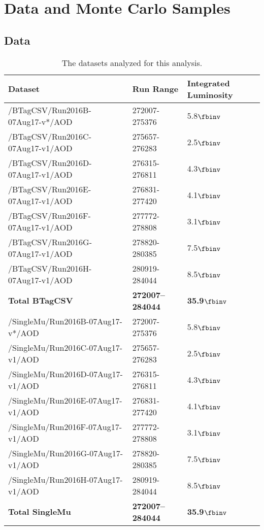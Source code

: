 \section{Data and Monte Carlo Samples}
\subsection{Data}

\begin{table}[hbtp]\footnotesize
\centering
\begin{tabular}{l l l}
\hline
 Dataset & Run Range & Integrated Luminosity \\
\hline
/BTagCSV/Run2016B-07Aug17-v*/AOD & 272007-275376 & 5.8$\fbinv$ \\
/BTagCSV/Run2016C-07Aug17-v1/AOD & 275657-276283 & 2.5$\fbinv$ \\
/BTagCSV/Run2016D-07Aug17-v1/AOD & 276315-276811 & 4.3$\fbinv$ \\
/BTagCSV/Run2016E-07Aug17-v1/AOD & 276831-277420 & 4.1$\fbinv$ \\
/BTagCSV/Run2016F-07Aug17-v1/AOD & 277772-278808 & 3.1$\fbinv$ \\
/BTagCSV/Run2016G-07Aug17-v1/AOD & 278820-280385 & 7.5$\fbinv$ \\
/BTagCSV/Run2016H-07Aug17-v1/AOD & 280919-284044 & 8.5$\fbinv$ \\
{\bf Total BTagCSV} & {\bf 272007--284044} & {\bf 35.9$\fbinv$} \\
\hline
/SingleMu/Run2016B-07Aug17-v*/AOD & 272007-275376 & 5.8$\fbinv$ \\
/SingleMu/Run2016C-07Aug17-v1/AOD & 275657-276283 & 2.5$\fbinv$ \\
/SingleMu/Run2016D-07Aug17-v1/AOD & 276315-276811 & 4.3$\fbinv$ \\
/SingleMu/Run2016E-07Aug17-v1/AOD & 276831-277420 & 4.1$\fbinv$ \\
/SingleMu/Run2016F-07Aug17-v1/AOD & 277772-278808 & 3.1$\fbinv$ \\
/SingleMu/Run2016G-07Aug17-v1/AOD & 278820-280385 & 7.5$\fbinv$ \\
/SingleMu/Run2016H-07Aug17-v1/AOD & 280919-284044 & 8.5$\fbinv$ \\
{\bf Total SingleMu} & {\bf 272007--284044} & {\bf 35.9$\fbinv$} \\
\hline
\end{tabular}
\caption{The datasets analyzed for this analysis.}
\label{tab:dataSamples}
\end{table}

